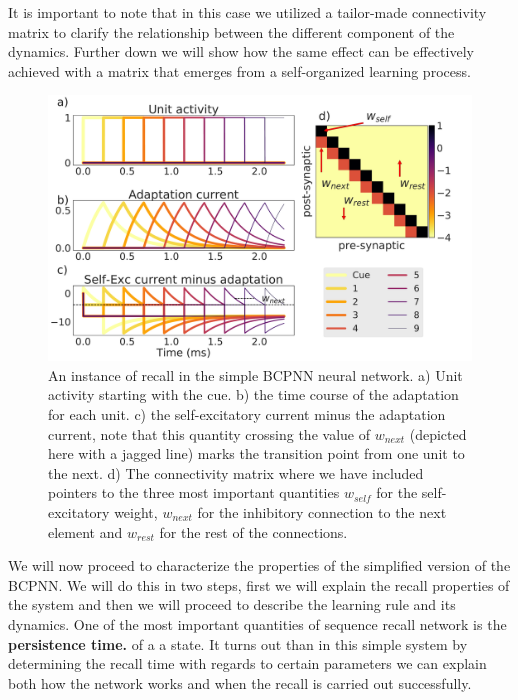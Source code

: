 \documentclass[10pt,a4paper]{article}
\begin{document}
It is important to note that in this case we utilized a tailor-made connectivity matrix to clarify the relationship between the different component of the dynamics. Further down we will show how the same effect can be effectively achieved with a matrix that emerges from a self-organized learning process.  

\begin{figure}[H]
\centering
\includegraphics[scale=0.26]{simple_bcpnn_recall.pdf}
\caption{An instance of recall in the simple BCPNN neural network. a) Unit activity starting with the cue. b) the time course of the adaptation for each unit. c) the self-excitatory current minus the adaptation current, note that this quantity crossing the value of $w_{next}$ (depicted here with a jagged line) marks the transition point from one unit to the next. d) The connectivity matrix where we have included pointers to the three most important quantities $w_{self}$ for the self-excitatory weight, $w_{next}$ for the inhibitory connection to the next element and $w_{rest}$ for the rest of the connections.}
\label{fig:bcpnn_simple_recall}
\end{figure}


We will now proceed to characterize the properties of the simplified version of the BCPNN. We will do this in two steps, first we will explain the recall properties of the system and then we will proceed to describe the learning rule and its dynamics. One of the most important quantities of sequence recall network is the \textbf{persistence time.} of a a state. It turns out than in this simple system by determining the recall time with regards to certain parameters we can explain both how the network works and when the recall is carried out successfully.
\end{document}
